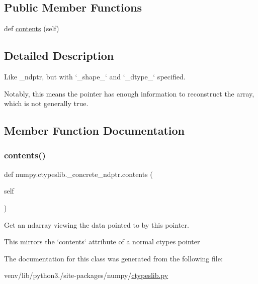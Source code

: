 \subsection*{Public Member Functions}
\begin{DoxyCompactItemize}
\item 
def \hyperlink{classnumpy_1_1ctypeslib_1_1__concrete__ndptr_a06ed84e3ef6d6114ae21395d99e28288}{contents} (self)
\end{DoxyCompactItemize}


\subsection{Detailed Description}
\begin{DoxyVerb}Like _ndptr, but with `_shape_` and `_dtype_` specified.

Notably, this means the pointer has enough information to reconstruct
the array, which is not generally true.
\end{DoxyVerb}
 

\subsection{Member Function Documentation}
\mbox{\label{classnumpy_1_1ctypeslib_1_1__concrete__ndptr_a06ed84e3ef6d6114ae21395d99e28288}} 
\subsubsection{\texorpdfstring{contents()}{contents()}}
{\footnotesize\ttfamily def numpy.\+ctypeslib.\+\_\+concrete\+\_\+ndptr.\+contents (\begin{DoxyParamCaption}\item[{}]{self }\end{DoxyParamCaption})}

\begin{DoxyVerb}Get an ndarray viewing the data pointed to by this pointer.

This mirrors the `contents` attribute of a normal ctypes pointer
\end{DoxyVerb}
 

The documentation for this class was generated from the following file\+:\begin{DoxyCompactItemize}
\item 
venv/lib/python3./site-\/packages/numpy/\hyperlink{ctypeslib_8py}{ctypeslib.\+py}\end{DoxyCompactItemize}
